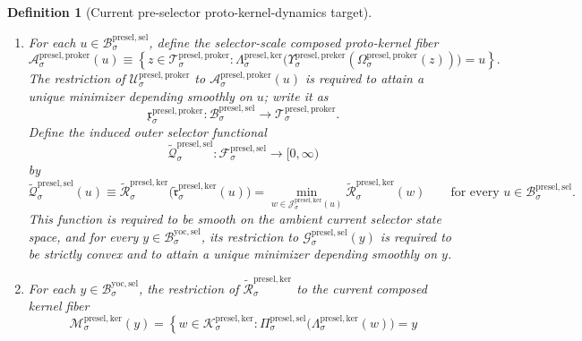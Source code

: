\documentclass[11pt]{article}
\newcommand{\YoctoSelectorBody}[1]{\mathcal B_{#1}^{\mathrm{yoc,sel}}}
\newcommand{\PreSectionSelectorSpace}[1]{\mathcal F_{#1}^{\mathrm{presel,sel}}}
\newcommand{\PreSectionSelectorBody}[1]{\mathcal B_{#1}^{\mathrm{presel,sel}}}
\newcommand{\PreSectionSelectorProj}[1]{\Pi_{#1}^{\mathrm{presel,sel}}}
\newcommand{\PreSectionSelectorFiber}[2]{\mathcal G_{#1}^{\mathrm{presel,sel}}(#2)}
\newcommand{\KernelSpace}[1]{\mathcal H_{#1}^{\mathrm{presel,ker}}}
\newcommand{\KernelBody}[1]{\mathcal K_{#1}^{\mathrm{presel,ker}}}
\newcommand{\KernelProj}[1]{\Lambda_{#1}^{\mathrm{presel,ker}}}
\newcommand{\KernelFiber}[2]{\mathcal J_{#1}^{\mathrm{presel,ker}}(#2)}
\newcommand{\KernelComposedFiber}[2]{\mathcal M_{#1}^{\mathrm{presel,ker}}(#2)}
\newcommand{\PreKernelProj}[1]{\Upsilon_{#1}^{\mathrm{presel,preker}}}
\newcommand{\PreKernelFiber}[2]{\mathcal U_{#1}^{\mathrm{presel,preker}}(#2)}
\newcommand{\ProtoKernelBody}[1]{\mathcal T_{#1}^{\mathrm{presel,proker}}}
\newcommand{\ProtoKernelProj}[1]{\Omega_{#1}^{\mathrm{presel,proker}}}
\newcommand{\ProtoKernelFunctional}[1]{\mathscr U_{#1}^{\mathrm{presel,proker}}}
\newcommand{\ProtoKernelSelectorFiber}[2]{\mathcal A_{#1}^{\mathrm{presel,proker}}(#2)}
\newcommand{\ProtoKernelSelectorMin}[1]{\mathfrak x_{#1}^{\mathrm{presel,proker}}}
\newcommand{\InducedSelectorFunctional}[1]{\widetilde{\mathscr Q}_{#1}^{\mathrm{presel,sel}}}
\newcommand{\InducedKernelFunctional}[1]{\widetilde{\mathscr R}_{#1}^{\mathrm{presel,ker}}}
\newcommand{\InducedKernelMinLift}[1]{\widetilde{\mathfrak r}_{#1}^{\mathrm{presel,ker}}}
\newcommand{\InducedPreKernelFunctional}[1]{\widetilde{\mathscr S}_{#1}^{\mathrm{presel,preker}}}
\newcommand{\InducedPreKernelMinLift}[1]{\widetilde{\mathfrak s}_{#1}^{\mathrm{presel,preker}}}
\newtheorem{definition}{Definition}
\begin{document}
\begin{definition}[Current pre-selector proto-kernel-dynamics target]
\begin{enumerate}
\[    \]
    Define the induced current kernel functional
    \[
    \InducedKernelFunctional{\sigma}:\KernelSpace{\sigma}\to[0,\infty)
    \]
    by
    \[
    \InducedKernelFunctional{\sigma}(w)
    \equiv
    \InducedPreKernelFunctional{\sigma}\bigl(\InducedPreKernelMinLift{\sigma}(w)\bigr)
    =
    \min_{q\in\PreKernelFiber{\sigma}{w}}
    \InducedPreKernelFunctional{\sigma}(q)
    \qquad
    \text{for every }
    w\in\KernelBody{\sigma}.
    \]
    This function is required to be smooth on the ambient current kernel state space, and for every \(u\in\PreSectionSelectorBody{\sigma}\), its restriction to \(\KernelFiber{\sigma}{u}\) is required to be strictly convex and to attain a unique minimizer depending smoothly on \(u\); write it as
    \[
    \InducedKernelMinLift{\sigma}:\PreSectionSelectorBody{\sigma}\to\KernelBody{\sigma}.
    \]
    \item For each \(u\in\PreSectionSelectorBody{\sigma}\), define the selector-scale composed proto-kernel fiber
    \[
    \ProtoKernelSelectorFiber{\sigma}{u}
    \equiv
    \left\{
    z\in\ProtoKernelBody{\sigma}:
    \KernelProj{\sigma}\bigl(\PreKernelProj{\sigma}(\ProtoKernelProj{\sigma}(z))\bigr)=u
    \right\}.
    \]
    The restriction of \(\ProtoKernelFunctional{\sigma}\) to \(\ProtoKernelSelectorFiber{\sigma}{u}\) is required to attain a unique minimizer depending smoothly on \(u\); write it as
    \[
    \ProtoKernelSelectorMin{\sigma}:\PreSectionSelectorBody{\sigma}\to\ProtoKernelBody{\sigma}.
    \]
    Define the induced outer selector functional
    \[
    \InducedSelectorFunctional{\sigma}:\PreSectionSelectorSpace{\sigma}\to[0,\infty)
    \]
    by
    \[
    \InducedSelectorFunctional{\sigma}(u)
    \equiv
    \InducedKernelFunctional{\sigma}\bigl(\InducedKernelMinLift{\sigma}(u)\bigr)
    =
    \min_{w\in\KernelFiber{\sigma}{u}}
    \InducedKernelFunctional{\sigma}(w)
    \qquad
    \text{for every }
    u\in\PreSectionSelectorBody{\sigma}.
    \]
    This function is required to be smooth on the ambient current selector state space, and for every \(y\in\YoctoSelectorBody{\sigma}\), its restriction to \(\PreSectionSelectorFiber{\sigma}{y}\) is required to be strictly convex and to attain a unique minimizer depending smoothly on \(y\).
    \item For each \(y\in\YoctoSelectorBody{\sigma}\), the restriction of \(\InducedKernelFunctional{\sigma}\) to the current composed kernel fiber
    \[
    \KernelComposedFiber{\sigma}{y}
    =
    \left\{
    w\in\KernelBody{\sigma}:
    \PreSectionSelectorProj{\sigma}\bigl(\KernelProj{\sigma}(w)\bigr)=y
\]
\end{enumerate}
\end{definition}
\end{document}
